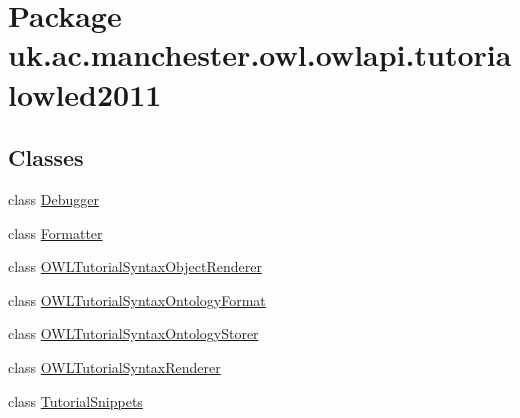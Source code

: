 \hypertarget{namespaceuk_1_1ac_1_1manchester_1_1owl_1_1owlapi_1_1tutorialowled2011}{\section{Package uk.\-ac.\-manchester.\-owl.\-owlapi.\-tutorialowled2011}
\label{namespaceuk_1_1ac_1_1manchester_1_1owl_1_1owlapi_1_1tutorialowled2011}
}
\subsection*{Classes}
\begin{DoxyCompactItemize}
\item 
class \hyperlink{classuk_1_1ac_1_1manchester_1_1owl_1_1owlapi_1_1tutorialowled2011_1_1_debugger}{Debugger}
\item 
class \hyperlink{classuk_1_1ac_1_1manchester_1_1owl_1_1owlapi_1_1tutorialowled2011_1_1_formatter}{Formatter}
\item 
class \hyperlink{classuk_1_1ac_1_1manchester_1_1owl_1_1owlapi_1_1tutorialowled2011_1_1_o_w_l_tutorial_syntax_object_renderer}{O\-W\-L\-Tutorial\-Syntax\-Object\-Renderer}
\item 
class \hyperlink{classuk_1_1ac_1_1manchester_1_1owl_1_1owlapi_1_1tutorialowled2011_1_1_o_w_l_tutorial_syntax_ontology_format}{O\-W\-L\-Tutorial\-Syntax\-Ontology\-Format}
\item 
class \hyperlink{classuk_1_1ac_1_1manchester_1_1owl_1_1owlapi_1_1tutorialowled2011_1_1_o_w_l_tutorial_syntax_ontology_storer}{O\-W\-L\-Tutorial\-Syntax\-Ontology\-Storer}
\item 
class \hyperlink{classuk_1_1ac_1_1manchester_1_1owl_1_1owlapi_1_1tutorialowled2011_1_1_o_w_l_tutorial_syntax_renderer}{O\-W\-L\-Tutorial\-Syntax\-Renderer}
\item 
class \hyperlink{classuk_1_1ac_1_1manchester_1_1owl_1_1owlapi_1_1tutorialowled2011_1_1_tutorial_snippets}{Tutorial\-Snippets}
\end{DoxyCompactItemize}
